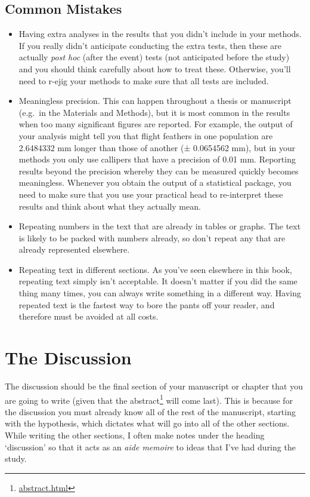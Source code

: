 \documentclass[
]{krantz}
\providecommand{\tightlist}{%
  \setlength{\itemsep}{0pt}\setlength{\parskip}{0pt}}
\renewcommand{\href}[2]{#2\footnote{\url{#1}}}
\begin{document}
\hypertarget{common-mistakes}{%
\subsection{Common Mistakes}\label{common-mistakes}}

\begin{itemize}
\tightlist
\item
  Having extra analyses in the results that you didn't include in your methods. If you really didn't anticipate conducting the extra tests, then these are actually \emph{post hoc} (after the event) tests (not anticipated before the study) and you should think carefully about how to treat these. Otherwise, you'll need to r-ejig your methods to make sure that all tests are included.
\item
  Meaningless precision. This can happen throughout a thesis or manuscript (e.g.~in the Materials and Methods), but it is most common in the results when too many significant figures are reported. For example, the output of your analysis might tell you that flight feathers in one population are 2.6484332 mm longer than those of another (± 0.0654562 mm), but in your methods you only use callipers that have a precision of 0.01 mm. Reporting results beyond the precision whereby they can be measured quickly becomes meaningless. Whenever you obtain the output of a statistical package, you need to make sure that you use your practical head to re-interpret these results and think about what they actually mean.
\item
  Repeating numbers in the text that are already in tables or graphs. The text is likely to be packed with numbers already, so don't repeat any that are already represented elsewhere.
\item
  Repeating text in different sections. As you've seen elsewhere in this book, repeating text simply isn't acceptable. It doesn't matter if you did the same thing many times, you can always write something in a different way. Having repeated text is the fastest way to bore the pants off your reader, and therefore must be avoided at all costs.
\end{itemize}

\hypertarget{discussion}{%
\section{The Discussion}\label{discussion}}

The discussion should be the final section of your manuscript or chapter that you are going to write (given that the \href{abstract.html}{abstract} will come last). This is because for the discussion you must already know all of the rest of the manuscript, starting with the hypothesis, which dictates what will go into all of the other sections. While writing the other sections, I often make notes under the heading `discussion' so that it acts as an \emph{aide memoire} to ideas that I've had during the study.
\end{document}
